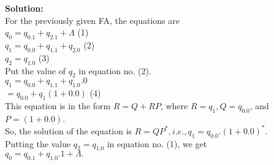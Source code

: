 \documentclass[9pt]{beamer}
\begin{document}
\begin{frame}
\textbf{Solution:}\\
\hspace*{0.5cm} For the previously given FA, the equations are\\

\hspace*{4cm} $q_0 = q_0.1 + q_2.1 + \Lambda$   \hspace*{3cm} (1) \\
\hspace*{4cm} $q_1 = q_0.0 + q_1.1 + q_2.0$     \hspace*{2.7cm} (2) \\
\hspace*{4cm} $q_2 = q_1.0$                     \hspace*{4.6cm} (3) \\

\hspace*{0.5cm} Put the value of $q_2$ in equation no. (2).\\
\hspace*{4cm} $q_1 = q_0.0 + q_1.1 + q_1.0.0$ \\
\hspace*{4.4cm} $= q_0.0 + q_1(1 + 0.0)$  \hspace*{2.7cm} (4)\\   

\vspace*{0.1cm}
\hspace*{0.5cm} This equation is in the form $R = Q + RP$, where $R = q_1, Q = q_0.0$, and $P = (1 + 0.0)$.\\
\hspace*{0.5cm} So, the solution of the equation is $R = QP^*, i.e., q_1 = q_0.0. (1 + 0.0)^*$.\\
\hspace*{0.5cm} Putting the value $q_2 = q_1.0$ in equation no. (1), we get\\

\vspace*{0.1cm}
\hspace*{4.4cm} $q_0 = q_0.1 + q_1.0.1 + \Lambda.$ \\

\vspace*{0.1cm}
\end{frame}
\end{document}
